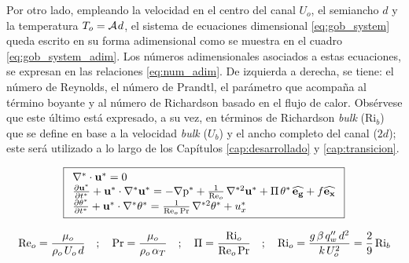 Por otro lado, empleando la velocidad en el centro del canal $U_o$, el semiancho $d$ y la temperatura $T_o = \mathcal{A} \hspace{0.3mm} d $, el sistema de ecuaciones dimensional \ref{eq:gob_system} queda escrito en su forma adimensional como se muestra en el cuadro \ref{eq:gob_system_adim}. Los números adimensionales asociados a estas ecuaciones, se expresan en las relaciones \ref{eq:num_adim}. De izquierda a derecha, se tiene: el número de Reynolds, el número de Prandtl, el parámetro que acompaña al término boyante y al número de Richardson basado en el flujo de calor. Obsérvese que este último está expresado, a su vez, en términos de Richardson \textit{bulk} ($\text{Ri}_b$) que se define en base a la velocidad \textit{bulk} ($U_b$) y el ancho completo del canal ($2d$); este será utilizado a lo largo de los Capítulos \ref{cap:desarrollado} y \ref{cap:transicion}.


\begin{equation}
\boxed{
\begin{array}{l}
    \nabla^* \cdot \mathbf{u^*} = 0 \\
    \frac{\partial \mathbf{u^*}}{\partial t^*} + \mathbf{u^*} \cdot \nabla^* \mathbf{u^*} = 
    -\nabla \text{p}^* + \frac{1}{\text{Re}_o} \hspace{0.5mm} \nabla^{*2} \mathbf{u^*} + \Pi \hspace{0.5mm} \theta^* \hspace{0.5mm} \mathbf{\widehat{e_g}} + f \mathbf{\widehat{e_x}}  \\
    \frac{\partial \theta^*}{\partial t^*} + \mathbf{u^*} \cdot \nabla^* \theta^* = 
    \frac{1}{\text{Re}_o \hspace{0.5mm} \text{Pr}} \hspace{0.5mm} \nabla^{*2} \theta^* + u_x^* 
\end{array}
}
\label{eq:gob_system_adim}
\end{equation}

\begin{equation}
\text{Re}_o = \frac{\mu_o}{\rho_o \hspace{0.5mm} U_o \hspace{0.5mm} d } \quad ; \quad \text{Pr}= \frac{\mu_o}{\rho_o \hspace{0.5mm} \alpha_{T}} \quad ; \quad \Pi = \frac{\text{Ri}_o}{\text{Re}_o \hspace{0.5mm} \text{Pr}} \quad ; \quad \text{Ri}_o = \frac{g \hspace{0.5mm} \beta \hspace{0.5mm} q''_w \hspace{0.5mm} d^2}{k \hspace{0.5mm} U_o^2} = \frac{2}{9} \hspace{0.5mm} \text{Ri}_b
\label{eq:num_adim}
\end{equation}

